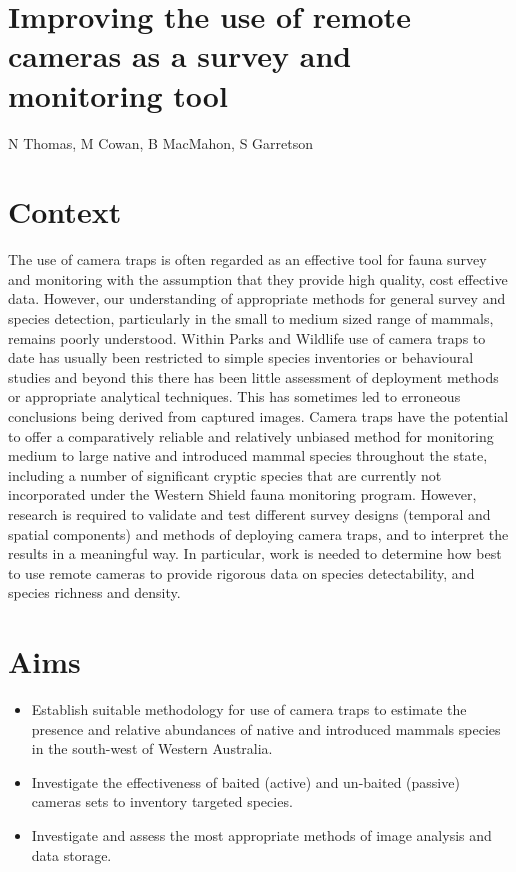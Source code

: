 \documentclass[version=last,
    paper=a4, %
    10pt, %
    usenames,
    dvipsnames,
    oneside, %
    headings=openany, %
    DIV=15 %
]{scrbook}
\begin{document}
\section*{Improving the use of remote cameras as a survey and monitoring tool
}

N Thomas, M Cowan, B MacMahon, S Garretson


\section*{Context}
The use of camera traps is often regarded as an effective tool for fauna
survey and monitoring with the assumption that they provide high
quality, cost effective data. However, our understanding of appropriate
methods for general survey and species detection, particularly in the
small to medium sized range of mammals, remains poorly understood.
Within Parks and Wildlife use of camera traps to date has usually been
restricted to simple species inventories or behavioural studies and
beyond this there has been little assessment of deployment methods or
appropriate analytical techniques. This has sometimes led to erroneous
conclusions being derived from captured images. Camera traps have the
potential to offer a comparatively reliable and relatively unbiased
method for monitoring medium to large native and introduced mammal
species throughout the state, including a number of significant cryptic
species that are currently not incorporated under the Western Shield
fauna monitoring program. However, research is required to validate and
test different survey designs (temporal and spatial components) and
methods of deploying camera traps, and to interpret the results in a
meaningful way. In particular, work is needed to determine how best to
use remote cameras to provide rigorous data on species detectability,
and species richness and density.



\section*{Aims}
\begin{itemize}
\itemsep1pt\parskip0pt
\item
  Establish suitable methodology for use of camera traps to estimate the
  presence and relative abundances of native and introduced mammals
  species in the south-west of Western Australia.
\item
  Investigate the effectiveness of baited (active) and un-baited
  (passive) cameras sets to inventory targeted species.
\item
  Investigate and assess the most appropriate methods of image analysis
  and data storage.
\end{itemize}
\end{document}
